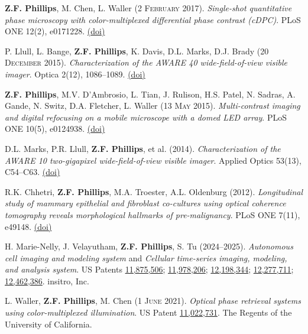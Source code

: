 \documentclass[12pt,letterpaper]{article}
\newcommand{\mhead}[1]{\leavevmode\marginpar{\raggedright\sffamily\footnotesize #1}}
\renewcommand{\date}[1]{#1}
\begin{document}
\medskip
\textbf{Z.F. Phillips}, M. Chen, L. Waller (\date{2 \textsc{February} 2017}). \emph{Single-shot quantitative phase microscopy with color-multiplexed differential phase contrast (cDPC)}. PLoS ONE 12(2), e0171228. \href{https://doi.org/10.1371/journal.pone.0171228}{(doi)}

\medskip
P. Llull, L. Bange, \textbf{Z.F. Phillips}, K. Davis, D.L. Marks, D.J. Brady (\date{20 \textsc{December} 2015}). \emph{Characterization of the AWARE 40 wide-field-of-view visible imager}. Optica 2(12), 1086--1089. \href{https://doi.org/10.1364/OPTICA.2.001086}{(doi)}

\medskip
\textbf{Z.F. Phillips}, M.V. D'Ambrosio, L. Tian, J. Rulison, H.S. Patel, N. Sadras, A. Gande, N. Switz, D.A. Fletcher, L. Waller (\date{13 \textsc{May} 2015}). \emph{Multi-contrast imaging and digital refocusing on a mobile microscope with a domed LED array}. PLoS ONE 10(5), e0124938. \href{https://doi.org/10.1371/journal.pone.0124938}{(doi)}

\medskip
D.L. Marks, P.R. Llull, \textbf{Z.F. Phillips}, et al. (\date{2014}). \emph{Characterization of the AWARE 10 two-gigapixel wide-field-of-view visible imager}. Applied Optics 53(13), C54--C63. \href{https://doi.org/10.1364/AO.53.000C54}{(doi)}

\medskip
R.K. Chhetri, \textbf{Z.F. Phillips}, M.A. Troester, A.L. Oldenburg (\date{2012}). \emph{Longitudinal study of mammary epithelial and fibroblast co-cultures using optical coherence tomography reveals morphological hallmarks of pre-malignancy}. PLoS ONE 7(11), e49148. \href{https://doi.org/10.1371/journal.pone.0049148}{(doi)}

\medskip
\mhead{Patents}%
\par\vspace{-\baselineskip}

\medskip
H. Marie-Nelly, J. Velayutham, \textbf{Z.F. Phillips}, S. Tu (\date{2024--2025}). \emph{Autonomous cell imaging and modeling system} and \emph{Cellular time-series imaging, modeling, and analysis system}. US Patents \href{https://patents.google.com/patent/US11875506B1}{11,875,506}; \href{https://patents.google.com/patent/US11978206B2}{11,978,206}; \href{https://patents.google.com/patent/US12198344B2}{12,198,344}; \href{https://patents.google.com/patent/US12277711B2}{12,277,711}; \href{https://patents.google.com/patent/US12462386B2}{12,462,386}. insitro, Inc.

\medskip
L. Waller, \textbf{Z.F. Phillips}, M. Chen (\date{1 \textsc{June} 2021}). \emph{Optical phase retrieval systems using color-multiplexed illumination}. US Patent \href{https://patents.google.com/patent/US11022731B2}{11,022,731}. The Regents of the University of California.
\end{document}
